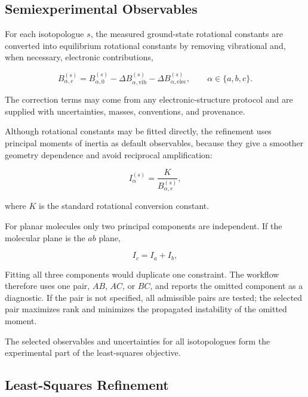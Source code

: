 \documentclass[aip,jcp,reprint,longbibliography,floatfix]{revtex4-2}
\begin{document}
\subsection{Semiexperimental Observables}

For each isotopologue $s$, the measured ground-state rotational constants are
converted into equilibrium rotational constants by removing vibrational and,
when necessary, electronic contributions,\cite{Costain1958,Pawlowski2002,Piccardo2015B3LYP,Penocchio2015B2PLYP}

\begin{equation}
B_{\alpha,e}^{(s)}
= B_{\alpha,0}^{(s)}
- \Delta B_{\alpha,\mathrm{vib}}^{(s)}
- \Delta B_{\alpha,\mathrm{elec}}^{(s)},
\qquad
\alpha \in \{a,b,c\}.
\end{equation}

The correction terms may come from any electronic-structure
protocol and are supplied with uncertainties, masses, conventions, and
provenance.\cite{Mendolicchio2025FastDvib}

Although rotational constants may be fitted directly, the refinement uses
principal moments of inertia as default observables, because they give a smoother
geometry dependence and avoid reciprocal amplification:

\begin{equation}
I_{\alpha}^{(s)}
=
\frac{K}
{B_{\alpha,e}^{(s)}},
\end{equation}

where $K$ is the standard rotational conversion constant.

For planar molecules only two principal components are independent. If the
molecular plane is the $ab$ plane,

\begin{equation}
I_c = I_a + I_b ,
\end{equation}

Fitting all three components would duplicate one constraint. The workflow
therefore uses one pair, $AB$, $AC$, or $BC$, and reports the omitted component
as a diagnostic. If the pair is not specified, all admissible pairs are tested;
the selected pair maximizes rank and minimizes the propagated instability of
the omitted moment.

The selected observables and uncertainties for all isotopologues form the
experimental part of the least-squares objective.


\subsection{Least-Squares Refinement}
\end{document}
